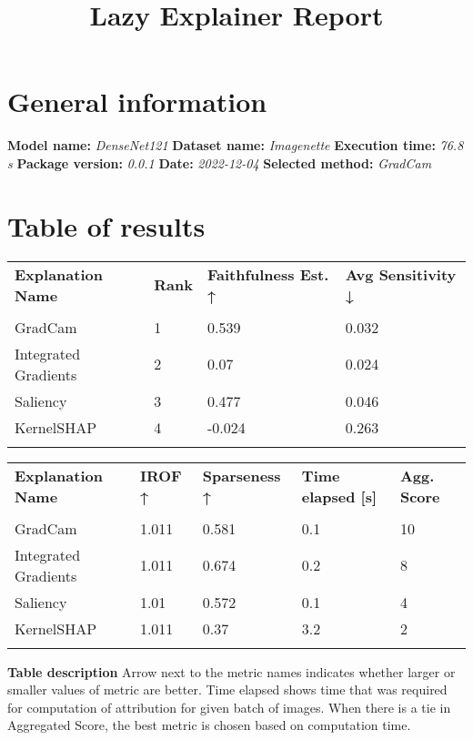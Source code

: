 \documentclass{article}%
\title{Lazy Explainer Report}%
\date{}%
\begin{document}
%
\normalsize%
\maketitle%
\section*{General information}%
\label{sec:Generalinformation}%
\textbf{Model name: }%
\textit{DenseNet121 \newline%
}%
\textbf{Dataset name: }%
\textit{Imagenette \newline%
}%
\textbf{Execution time: }%
\textit{76.8 s \newline%
}%
\textbf{Package version: }%
\textit{0.0.1 \newline%
}%
\textbf{Date: }%
\textit{2022{-}12{-}04 \newline%
}%
\textbf{Selected method: }%
\textit{GradCam}

%
\section*{Table of results}%
\label{sec:Tableofresults}%
\begin{center}%
\begin{tabu}to 17cm{X[r] X[r] X[r] X[r] }%
\textbf{Explanation Name}&\textbf{Rank}&\textbf{Faithfulness Est. ↑}&\textbf{Avg Sensitivity ↓}\\%
&&&\\%
\hline%
GradCam&1&0.539&0.032\\%
%
\hline%
Integrated Gradients&2&0.07&0.024\\%
%
\hline%
Saliency&3&0.477&0.046\\%
%
\hline%
KernelSHAP&4&{-}0.024&0.263\\%
%
\hline%
\end{tabu}%
\end{center}%
\begin{center}%
\begin{tabu}to 17cm{X[r] X[r] X[r] X[r] X[r] }%
\textbf{Explanation Name}&\textbf{IROF ↑}&\textbf{Sparseness ↑}&\textbf{Time elapsed {[}s{]}}&\textbf{Agg. Score}\\%
&&&&\\%
\hline%
GradCam&1.011&0.581&0.1&10\\%
%
\hline%
Integrated Gradients&1.011&0.674&0.2&8\\%
%
\hline%
Saliency&1.01&0.572&0.1&4\\%
%
\hline%
KernelSHAP&1.011&0.37&3.2&2\\%
%
\hline%
\end{tabu}%
\end{center}%
\textbf{Table description \newline%
}%
Arrow next to the metric names indicates whether larger or smaller values of metric are better. Time elapsed shows time that was required for computation of attribution for given batch of images. When there is a tie in Aggregated Score, the best metric is chosen based on computation time.
\end{document}
